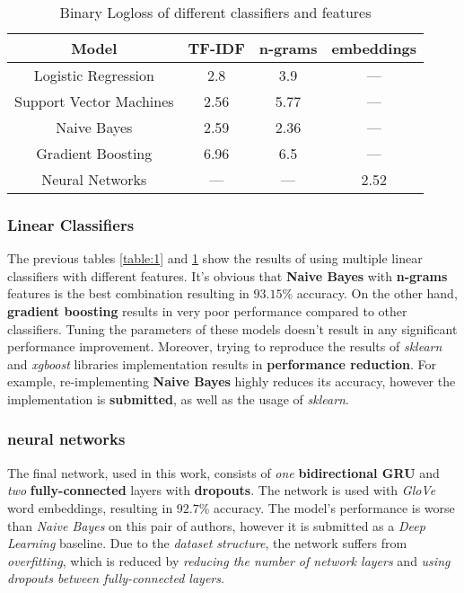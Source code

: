 \documentclass[letterpaper, 10 pt, conference]{ieeeconf}  %
\begin{document}
\begin{table}[h!]
\centering
\begin{tabular}{||c | c | c | c||} 
 \hline
 Model & TF-IDF & n-grams & embeddings \\ [0.5ex] 
 \hline\hline
 Logistic Regression & 2.8 & 3.9 & --- \\ 
 \hline
 Support Vector Machines & 2.56 & 5.77 & --- \\
 \hline
 Naive Bayes & 2.59 & 2.36 & --- \\
 \hline
 Gradient Boosting & 6.96 & 6.5 & --- \\
 \hline
 Neural Networks & --- & --- & 2.52 \\ [1ex] 
 \hline
\end{tabular}
\caption{Binary Logloss of different classifiers and features}
\label{table:2}
\end{table}

\subsubsection{Linear Classifiers}
The previous tables \ref{table:1} and \ref{table:2} show the results of using multiple linear classifiers with different features. It's obvious that \textbf{Naive Bayes} with \textbf{n-grams} features is the best combination resulting in $93.15$\% accuracy. On the other hand, \textbf{gradient boosting} results in very poor performance compared to other classifiers. Tuning the parameters of these models doesn't result in any significant performance improvement. Moreover, trying to reproduce the results of \emph{sklearn} and \emph{xgboost} libraries implementation results in \textbf{performance reduction}. For example, re-implementing \textbf{Naive Bayes} highly reduces its accuracy, however the implementation is \textbf{submitted}, as well as the usage of \emph{sklearn}.

\subsubsection{neural networks}
The final network, used in this work, consists of \emph{one} \textbf{bidirectional GRU} and \emph{two} \textbf{fully-connected} layers with \textbf{dropouts}. The network is used with \emph{GloVe} word embeddings, resulting in $92.7$\% accuracy. The model's performance is worse than \emph{Naive Bayes} on this pair of authors, however it is submitted as a \emph{Deep Learning} baseline. Due to the \emph{dataset structure}, the network suffers from \emph{overfitting}, which is reduced by \emph{reducing the number of network layers} and \emph{using dropouts between fully-connected layers}.
\end{document}
